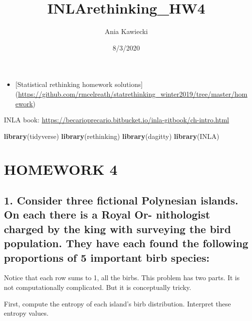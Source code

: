 \documentclass[
]{article}
\title{INLArethinking\_HW4}
\author{Ania Kawiecki}
\date{8/3/2020}
\newenvironment{Shaded}{\begin{snugshade}}{\end{snugshade}}
\newcommand{\KeywordTok}[1]{\textcolor[rgb]{0.13,0.29,0.53}{\textbf{#1}}}
\newcommand{\NormalTok}[1]{#1}
\providecommand{\tightlist}{%
  \setlength{\itemsep}{0pt}\setlength{\parskip}{0pt}}
\begin{document}
\maketitle

\begin{itemize}
\tightlist
\item
  {[}Statistical rethinking homework solutions{]}
  (\url{https://github.com/rmcelreath/statrethinking_winter2019/tree/master/homework})
\end{itemize}

INLA book:
\url{https://becarioprecario.bitbucket.io/inla-gitbook/ch-intro.html}

\begin{Shaded}
\begin{Highlighting}[]
\KeywordTok{library}\NormalTok{(tidyverse)}
\KeywordTok{library}\NormalTok{(rethinking)}
\KeywordTok{library}\NormalTok{(dagitty)}
\KeywordTok{library}\NormalTok{(INLA)}
\end{Highlighting}
\end{Shaded}

\hypertarget{homework-4}{%
\section{HOMEWORK 4}\label{homework-4}}

\hypertarget{consider-three-fictional-polynesian-islands.-on-each-there-is-a-royal-or--nithologist-charged-by-the-king-with-surveying-the-bird-population.-they-have-each-found-the-following-proportions-of-5-important-birb-species}{%
\subsection{1. Consider three fictional Polynesian islands. On each
there is a Royal Or- nithologist charged by the king with surveying the
bird population. They have each found the following proportions of 5
important birb
species:}\label{consider-three-fictional-polynesian-islands.-on-each-there-is-a-royal-or--nithologist-charged-by-the-king-with-surveying-the-bird-population.-they-have-each-found-the-following-proportions-of-5-important-birb-species}}

Notice that each row sums to 1, all the birbs. This problem has two
parts. It is not computationally complicated. But it is conceptually
tricky.

First, compute the entropy of each island's birb distribution. Interpret
these entropy values.
\end{document}
